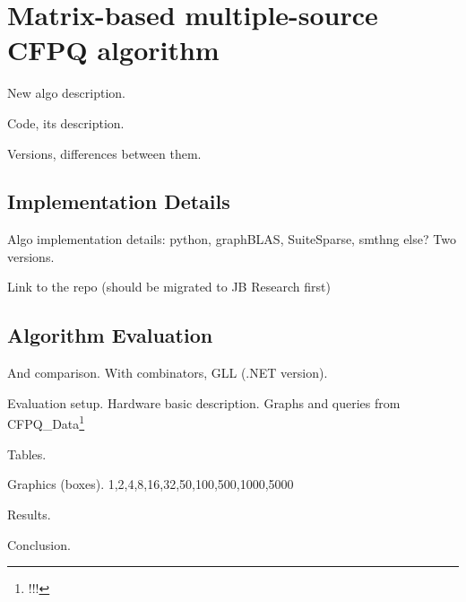 \section{Matrix-based multiple-source CFPQ algorithm}

New algo description.

Code, its description.

Versions, differences between them.

\subsection{Implementation Details}

Algo implementation details: python, graphBLAS, SuiteSparse, smthng else? Two versions.

Link to the repo (should be migrated to JB Research first)

\subsection{Algorithm Evaluation}

And comparison. With combinators, GLL (.NET version).

Evaluation setup.
Hardware basic description.
Graphs and queries from CFPQ\_Data\footnote{!!!}

Tables.

Graphics (boxes). 1,2,4,8,16,32,50,100,500,1000,5000

Results.

Conclusion. 